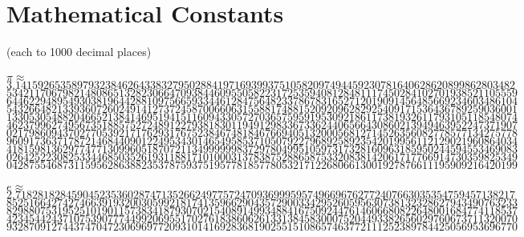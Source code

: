 \documentclass{tufte-book}
\begin{document}
\newpage
\section{Mathematical Constants}
(each to 1000 decimal places)
\\~\\$\pi\approx$\\
$3.14159265358979323846264338327950288419716939937510582097494459230781640628620899862803482$\\
$5342117067982148086513282306647093844609550582231725359408128481117450284102701938521105559$\\
$6446229489549303819644288109756659334461284756482337867831652712019091456485669234603486104$\\
$5432664821339360726024914127372458700660631558817488152092096282925409171536436789259036001$\\
$1330530548820466521384146951941511609433057270365759591953092186117381932611793105118548074$\\
$4623799627495673518857527248912279381830119491298336733624406566430860213949463952247371907$\\
$0217986094370277053921717629317675238467481846766940513200056812714526356082778577134275778$\\
$9609173637178721468440901224953430146549585371050792279689258923542019956112129021960864034$\\
$4181598136297747713099605187072113499999983729780499510597317328160963185950244594553469083$\\
$0264252230825334468503526193118817101000313783875288658753320838142061717766914730359825349$\\
$0428755468731159562863882353787593751957781857780532171226806613001927876611195909216420199$
\\~\\
$e\approx$\\
$2.71828182845904523536028747135266249775724709369995957496696762772407663035354759457138217$\\
$8525166427427466391932003059921817413596629043572900334295260595630738132328627943490763233$\\
$8298807531952510190115738341879307021540891499348841675092447614606680822648001684774118537$\\
$4234544243710753907774499206955170276183860626133138458300075204493382656029760673711320070$\\
$9328709127443747047230696977209310141692836819025515108657463772111252389784425056953696770$\\
\end{document}
